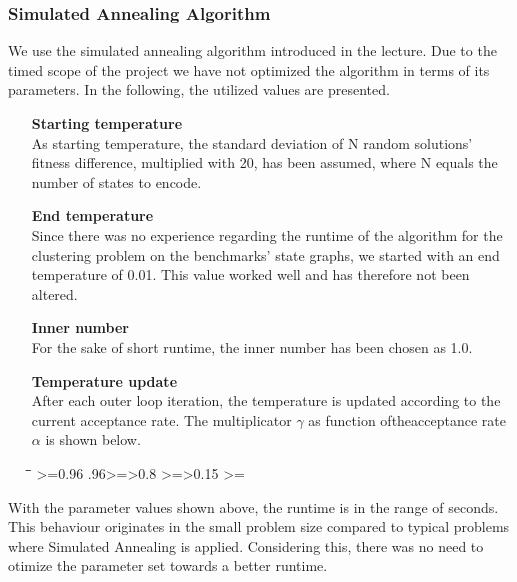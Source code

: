 \subsubsection{Simulated Annealing Algorithm}
\label{subsubsec:SAAlgorithm}

We use the simulated annealing algorithm introduced in the lecture. Due to the timed scope of the project we have not optimized the algorithm in terms of its parameters. In the following, the utilized values are presented.

\begin{itemize}
\item[\textbf{Starting temperature}]\hfill \\
As starting temperature, the standard deviation of N random solutions' fitness difference, multiplied with 20, has been assumed, where N equals the number of states to encode.
\item[\textbf{End temperature}]\hfill \\
Since there was no experience regarding the runtime of the algorithm for the clustering problem on the benchmarks' state graphs, we started with an end temperature of 0.01. This value worked well and has therefore not been altered.
\item[\textbf{Inner number}]\hfill \\
For the sake of short runtime, the inner number has been chosen as 1.0.
\item[\textbf{Temperature update}]\hfill \\
After each outer loop iteration, the temperature is updated according to the current acceptance rate. The multiplicator $\gamma$ as function oftheacceptance rate $\alpha$ is shown below.

\begin{tabbing}
\hspace{4cm}\=\hspace{4cm}\=\hspace{4cm}\=\kill
 \alpha>=0.96  \>\0.96>=\alpha>0.8 >=\alpha>0.15  >=\alpha \\ 
  \>   \>   \> 
\end{tabbing} 
\end{itemize}


With the parameter values shown above, the runtime is in the range of seconds. This behaviour originates in the small problem size compared to typical problems where Simulated Annealing is applied. Considering this, there was no need to otimize the parameter set towards a better runtime.


